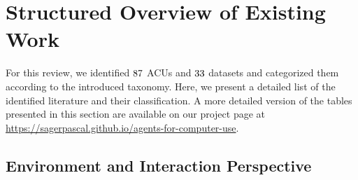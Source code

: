 
\section{Structured Overview of Existing Work}\label{sec:appendix_tables}

For this review, we identified $87$ ACUs and $33$ datasets and categorized them according to the introduced taxonomy. Here, we present a detailed list of the identified literature and their classification.
A more detailed version of the tables presented in this section are available on our project page at \url{https://sagerpascal.github.io/agents-for-computer-use}.




\subsection{Environment and Interaction Perspective}
\label{appendix_A1}

